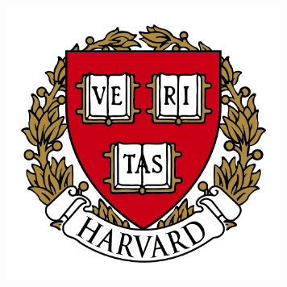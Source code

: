 \documentclass[landscape,a0b,final,a4resizeable]{include/a0poster}
\begin{document}
\begin{poster}
\begin{center}
\begin{pcolumn}{0.99}
{\begin{minipage}[c]{\logowidth}
\begin{flushright}
    \includegraphics[width=9cm,trim=2em 0em 2em 2em, clip]{badges/harvard}
  \end{flushright}
\end{minipage}
%
}
\end{pcolumn}
\end{center}

\vspace*{3cm}

\Large




\begin{multicols}{3}




\end{multicols}
\end{poster}
\end{document}
